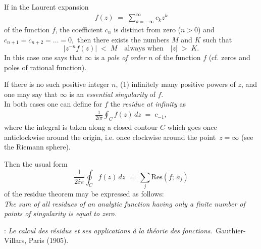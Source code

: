 \documentclass[12pt]{article}
\theoremstyle{definition}
\begin{document}

If in the Laurent expansion
\begin{align}
f(z) \;=\; \sum_{k=-\infty}^\infty c_kz^k
\end{align}
of the function $f$, the coefficient $c_n$ is distinct from zero ($n > 0$) and\, $c_{n+1} = c_{n+2} = \ldots = 0$,\, then there exists the numbers $M$ and $K$ such that
$$|z^{-n}f(z)| \;<\; M \quad \mbox{always when} \quad |z| \;>\; K.$$
In this case one says that $\infty$ is a \emph{pole of order} $n$ of the function $f$ (cf. zeros and poles of rational function).

If there is no such positive integer $n$, (1)  infinitely many positive powers of $z$, and one may say that $\infty$ is an \emph{essential singularity} of $f$.\\

In both cases one can define for $f$ the \emph{residue at infinity} as
\begin{align}
\frac{1}{2i\pi}\!\oint_C\!f(z)\,dz \;=\; c_{-1},
\end{align}
where the integral is taken along a closed contour $C$ which goes once anticlockwise around the origin, i.e. once clockwise around the point \,$z = \infty$ (see the Riemann sphere).

Then the usual form 
$$\frac{1}{2i\pi}\!\oint_C\!f(z)\,dz \;=\; \sum_j\mbox{Res}(f;\,a_j)$$
of the residue theorem may be expressed as follows:\\

\emph{The sum of all residues of an analytic function having only a finite number of points of singularity is equal to zero.}


\begin{thebibliography}{8}
: {\em Le calcul des r\'esidus et ses applications \`a la th\'eorie des fonctions}.\, Gauthier-Villars, Paris (1905).
\end{thebibliography}
\end{document}
